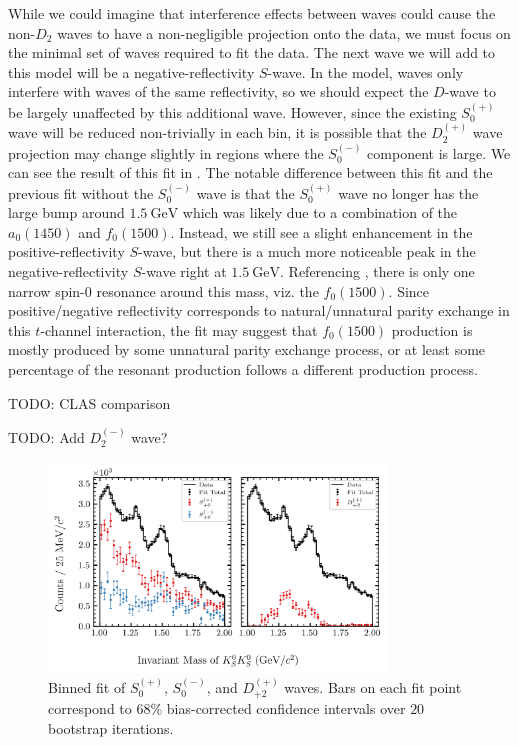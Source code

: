 While we could imagine that interference effects between waves could cause the non-$D_2$ waves to have a non-negligible projection onto the data, we must focus on the minimal set of waves required to fit the data. The next wave we will add to this model will be a negative-reflectivity $S$-wave. In the model, waves only interfere with waves of the same reflectivity, so we should expect the $D$-wave to be largely unaffected by this additional wave. However, since the existing $S_0^{(+)}$ wave will be reduced non-trivially in each bin, it is possible that the $D_2^{(+)}$ wave projection may change slightly in regions where the $S_0^{(-)}$ component is large. We can see the result of this fit in . The notable difference between this fit and the previous fit without the $S_0^{(-)}$ wave is that the $S_0^{(+)}$ wave no longer has the large bump around $\SI{1.5}{\giga\electronvolt}$ which was likely due to a combination of the $a_0(1450)$ and $f_0(1500)$. Instead, we still see a slight enhancement in the positive-reflectivity $S$-wave, but there is a much more noticeable peak in the negative-reflectivity $S$-wave right at $\SI{1.5}{\giga\electronvolt}$. Referencing , there is only one narrow spin-$0$ resonance around this mass, viz. the $f_0(1500)$. Since positive/negative reflectivity corresponds to natural/unnatural parity exchange in this $t$-channel interaction, the fit may suggest that $f_0(1500)$ production is mostly produced by some unnatural parity exchange process, or at least some percentage of the resonant production follows a different production process.

{\color{red}TODO: CLAS comparison}

{\color{red}TODO: Add $D_2^{(-)}$ wave?}

\begin{figure}
  \begin{center}
    \includegraphics[width=0.8\textwidth]{figures/binned_fit_chisqdof_3.4_splot_D_1s_2b_phase_factor_waves29099_uncertainty_bootstrap-CI-BC.png}
  \end{center}
  \caption{Binned fit of $S_{0}^{(+)}$, $S_{0}^{(-)}$, and $D_{+2}^{(+)}$ waves. Bars on each fit point correspond to $68\%$ bias-corrected confidence intervals over $20$ bootstrap iterations.}\label{fig:binned-fit-chisqdof-3.4-Spn-D2p}
\end{figure}



